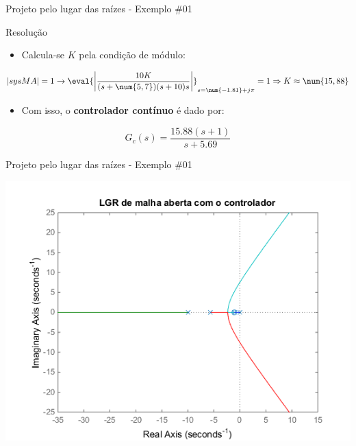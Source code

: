 \begin{frame}{Projeto pelo lugar das raízes - Exemplo \#01}
\begin{block}{Resolução}
\begin{itemize}
    \item Calcula-se $ K $ pela condição de módulo:
\end{itemize}

	\[ \left| sysMA \right|=1 \rightarrow \eval{\left| \dfrac{10K}{(s+\num{5,7})(s+10)s}\right|}_{s=\num{-1.81}+j\pi}=1\Rightarrow K\approx \num{15,88} \]

\begin{itemize}
    \item Com isso, o \textbf{controlador contínuo} é dado por:
\end{itemize}
	
	\[ G_c(s)=\dfrac{\num{15,88}(s+1)}{s+\num{5,69}} \]
\end{block}
\end{frame}

\begin{frame}{Projeto pelo lugar das raízes - Exemplo \#01}
\centerline{\includegraphics[width=0.8\linewidth]{Figuras/Ch10/fig2.png}}
\end{frame}



